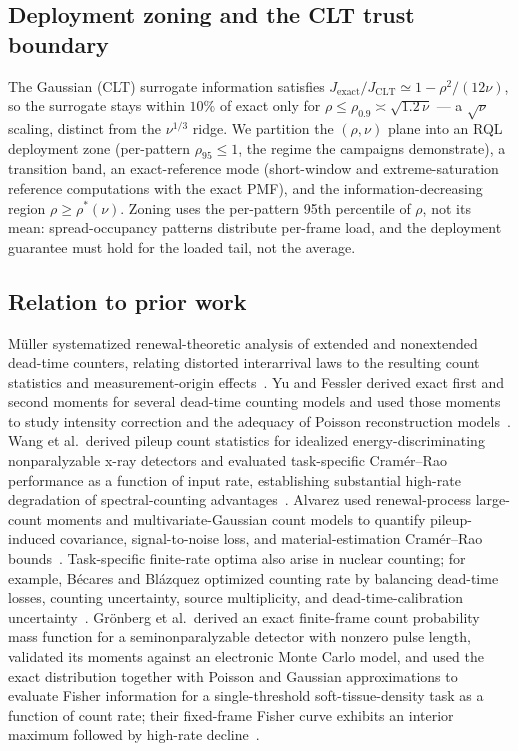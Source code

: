 \documentclass[10pt,twocolumn]{article}
\begin{document}
\subsection{Deployment zoning and the CLT trust boundary}
The Gaussian (CLT) surrogate information satisfies $J_{\mathrm{exact}} /
J_{\mathrm{CLT}} \simeq 1 - \rho^{2}/(12\nu)$, so the surrogate stays within
$10\%$ of exact only for $\rho \le \rho_{0.9} \asymp \sqrt{1.2\,\nu}$ — a
$\sqrt{\nu}$ scaling, distinct from the $\nu^{1/3}$ ridge. We partition the
$(\rho,\nu)$ plane into an RQL deployment zone (per-pattern
$\rho_{95} \le 1$, the regime the campaigns demonstrate), a transition band,
an exact-reference mode (short-window and extreme-saturation reference
computations with the exact PMF), and the information-decreasing region
$\rho \ge \rho^{*}(\nu)$. Zoning uses the per-pattern 95th percentile of
$\rho$, not its mean: spread-occupancy patterns distribute per-frame load,
and the deployment guarantee must hold for the loaded tail, not the average.

\subsection{Relation to prior work}
M\"uller systematized renewal-theoretic analysis of extended and
nonextended dead-time counters, relating distorted interarrival laws to
the resulting count statistics and measurement-origin
effects~\cite{muller1973deadtime}. Yu and Fessler derived exact first and
second moments for several dead-time counting models and used those
moments to study intensity correction and the adequacy of Poisson
reconstruction models~\cite{yu2000mean}. Wang et al.\ derived pileup
count statistics for idealized energy-discriminating nonparalyzable x-ray
detectors and evaluated task-specific Cram\'er--Rao performance as a
function of input rate, establishing substantial high-rate degradation of
spectral-counting advantages~\cite{wang2011pileup}. Alvarez used
renewal-process large-count moments and multivariate-Gaussian count
models to quantify pileup-induced covariance, signal-to-noise loss, and
material-estimation Cram\'er--Rao bounds~\cite{alvarez2014pileup}.
Task-specific finite-rate optima also arise in nuclear counting; for
example, B\'ecares and Bl\'azquez optimized counting rate by balancing
dead-time losses, counting uncertainty, source multiplicity, and
dead-time-calibration uncertainty~\cite{becares2012deadtime}. Gr\"onberg
et al.\ derived an exact finite-frame count probability mass function for
a seminonparalyzable detector with nonzero pulse length, validated its
moments against an electronic Monte Carlo model, and used the exact
distribution together with Poisson and Gaussian approximations to
evaluate Fisher information for a single-threshold soft-tissue-density
task as a function of count rate; their fixed-frame Fisher curve exhibits
an interior maximum followed by high-rate
decline~\cite{gronberg2018deadtime}.
\end{document}
